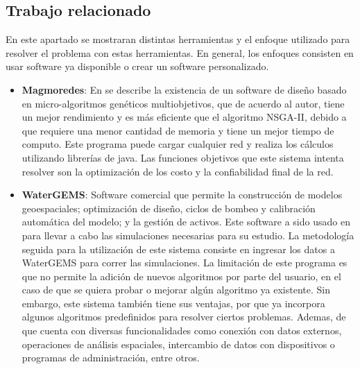 \documentclass[11pt,letterpaper]{article}
\begin{document}
\subsection{Trabajo relacionado} 

En este apartado se mostraran distintas herramientas y el enfoque utilizado para resolver el problema con estas herramientas. En general, los enfoques consisten en usar software ya disponible o crear un software personalizado.

\begin{itemize}
	\item \textbf{Magmoredes}: En \cite{Edwin2017} se describe la existencia de un software de diseño basado en micro-algoritmos genéticos multiobjetivos, que de acuerdo al autor, tiene un mejor rendimiento y es más eficiente que el algoritmo NSGA-II, debido a que requiere una menor cantidad de memoria y tiene un mejor tiempo de computo. Este programa puede cargar cualquier red y realiza los cálculos utilizando librerías de java. Las funciones objetivos que este sistema intenta resolver son la optimización de los costo y la confiabilidad final de la red.
	
	\item \textbf{WaterGEMS}: Software comercial que permite la  construcción de modelos geoespaciales; optimización de diseño, ciclos de bombeo y calibración automática del modelo; y la  gestión de activos. Este software a sido usado en \cite{Mehta2017} para llevar a cabo las simulaciones necesarias para su estudio. La metodología seguida para la utilización de este sistema consiste en ingresar los datos a WaterGEMS para correr las simulaciones. La limitación de este programa es que no permite la adición de nuevos algoritmos por parte del usuario, en el caso de que se quiera probar o mejorar algún algoritmo ya existente. Sin embargo, este sistema también tiene sus ventajas, por que ya incorpora algunos algoritmos predefinidos para resolver ciertos problemas. Ademas, de que cuenta con diversas funcionalidades como conexión con datos externos, operaciones de análisis espaciales, intercambio de datos con dispositivos o programas de administración, entre otros.
	

\end{itemize}
\end{document}
